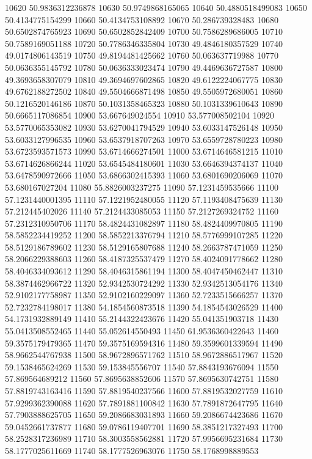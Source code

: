 {10620 50.9836312236878
10630 50.9749868165065
10640 50.4880518499083
10650 50.4134775154299
10660 50.4134753108892
10670 50.286739328483
10680 50.6502874765923
10690 50.6502852842409
10700 50.7586289686005
10710 50.7589169051188
10720 50.7786346335804
10730 49.4846180357529
10740 49.0174806143519
10750 49.8194481425662
10760 50.063637719988
10770 50.0636355145792
10780 50.0636333023474
10790 49.4469636727587
10800 49.3693658307079
10810 49.3694697602865
10820 49.6122224067775
10830 49.6762188272502
10840 49.5504666871498
10850 49.5505972680051
10860 50.1216520146186
10870 50.1031358465323
10880 50.1031339610643
10890 50.6665117086854
10900 53.667649024554
10910 53.577008502104
10920 53.5770065353082
10930 53.6270041794529
10940 53.6033147526148
10950 53.6033127996535
10960 53.6537918707263
10970 53.6559728780223
10980 53.6723593571573
10990 53.6714666274501
11000 53.6714646581215
11010 53.6714626866244
11020 53.6545484180601
11030 53.6646394374137
11040 53.6478590972666
11050 53.6866302415393
11060 53.6801690206069
11070 53.680167027204
11080 55.8826003237275
11090 57.1231459535666
11100 57.1231440001395
11110 57.1221952480055
11120 57.1193408475639
11130 57.212445402026
11140 57.2124433085053
11150 57.2127269324752
11160 57.2312310950706
11170 58.4824431082897
11180 58.4824409970805
11190 58.5852234419252
11200 58.5852213376794
11210 58.5776999107285
11220 58.5129186789602
11230 58.5129165807688
11240 58.2663787471059
11250 58.2066229388603
11260 58.4187325537479
11270 58.4024091778662
11280 58.4046334093612
11290 58.4046315861194
11300 58.4047450462447
11310 58.3874462966722
11320 52.9342530724292
11330 52.9342513054176
11340 52.9102177758987
11350 52.9102160229097
11360 52.7233515666257
11370 52.7232784198017
11380 54.1854560873518
11390 54.1854543026529
11400 54.1731932889149
11410 55.2144322423676
11420 55.041351903718
11430 55.0413508552465
11440 55.052614550493
11450 61.9536360422643
11460 59.3575179479365
11470 59.3575169594316
11480 59.3599601339594
11490 58.9662544767938
11500 58.9672896571762
11510 58.9672886517967
11520 59.1538465624269
11530 59.153845556707
11540 57.8843193676094
11550 57.869564689212
11560 57.8695638852606
11570 57.8695630742751
11580 57.8819743163416
11590 57.8819540237566
11600 57.8819532027759
11610 57.9299362390088
11620 57.7891881100842
11630 57.7891872647795
11640 57.7903888625705
11650 59.2086683031893
11660 59.2086674423686
11670 59.0452661737877
11680 59.0786119407701
11690 58.3851217327493
11700 58.2528317236989
11710 58.3003558562881
11720 57.9956695231684
11730 58.1777025611669
11740 58.1777526963076
11750 58.1768998889553
}
